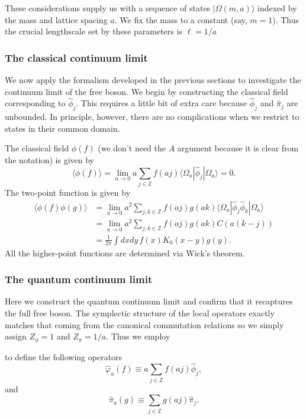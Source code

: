 \documentclass[prl,twocolumn,lengthcheck,superscriptaddress]{revtex4-1}
\theoremstyle{definition}
\theoremstyle{remark}
\begin{document}
These considerations supply us with a sequence of states $|\Omega(m,a)\rangle$ indexed by the mass and lattice spacing $a$. We fix the mass to a constant (say, $m=1$). Thus the crucial lengthscale set by these parameters is $\ell = 1/a$

\subsubsection{The classical continuum limit}
We now apply the formalism developed in the previous sections to investigate the continuum limit of the free boson. We begin by constructing the classical field corresponding to $\widehat{\phi}_j$. This requires a little bit of extra care because $\widehat{\phi}_j$ and $\widehat{\pi}_j$ are unbounded. In principle, however, there are no complications when we restrict to states in their common domain. 

The classical field $\phi(f)$ (we don't need the $A$ argument because it is clear from the notation) is given by
\begin{equation}
	\langle \phi(f)\rangle = \lim_{a\rightarrow 0} a\sum_{j\in \mathbb{Z}} f(aj) \langle \Omega_a| \widehat{\phi}_j |\Omega_a\rangle = 0.
\end{equation}
The two-point function is given by
\begin{equation}
	\begin{split}
	\langle \phi(f)\phi(g)\rangle &= \lim_{a\rightarrow 0} a^2\sum_{j,k\in \mathbb{Z}} f(aj)g(ak) \langle \Omega_a| \widehat{\phi}_j\widehat{\phi}_k |\Omega_a\rangle \\
	&= \lim_{a\rightarrow 0} a^2\sum_{j,k\in \mathbb{Z}} f(aj)g(ak) C(a(k-j)) \\
	&= \frac{1}{2\pi}\int dx dy \, f(x) K_0(x-y) g(y).
	\end{split}
\end{equation}
All the higher-point functions are determined via Wick's theorem.

\subsubsection{The quantum continuum limit}
Here we construct the quantum continuum limit and confirm that it recaptures the full free boson. The symplectic structure of the local operators exactly matches that coming from the canonical commutation relations so we simply assign $Z_{\phi} = 1$ and $Z_{\pi} = 1/a$. Thus we employ 

to define the following operators
\begin{equation}
	\widehat{\varphi}_a(f) \equiv a\sum_{j\in \mathbb{Z}} f(aj) \widehat{\phi}_j,
\end{equation}
and
\begin{equation}
	\widehat{\pi}_a(g) \equiv \sum_{j\in \mathbb{Z}} g(aj) \widehat{\pi}_j.
\end{equation}
\end{document}
